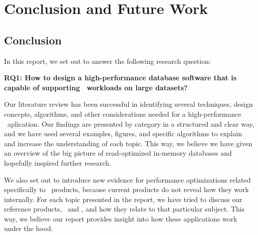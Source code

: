 \chapter{Conclusion and Future Work}
\label{chap:Conclusion and Future Work}

\section{Conclusion}
\label{sec:Conclusion}
In this report, we set out to answer the following research question:

\textbf{RQ1: How to design a high-performance database software that is capable of supporting \bd~workloads on large datasets?} 

Our literature review has been successful in identifying several techniques, design concepts, algorithms, and other considerations needed for a high-performance \bd~aplication. Our findings are presented by category in a structured and clear way, and we have used several examples, figures, and specific algorithms to explain and increase the understanding of each topic. This way, we believe we have given an overview of the big picture of read-optimized in-memory databases and hopefully inspired further research.

We also set out to introduce new evidence for performance optimizations related specifically to \bd~products, because current products do not reveal how they work internally. For each topic presented in the report, we have tried to discuss our reference products, \qlikview~and \tableau, and how they relate to that particular subject. This way, we believe our report provides insight into how these applications work under the hood.

